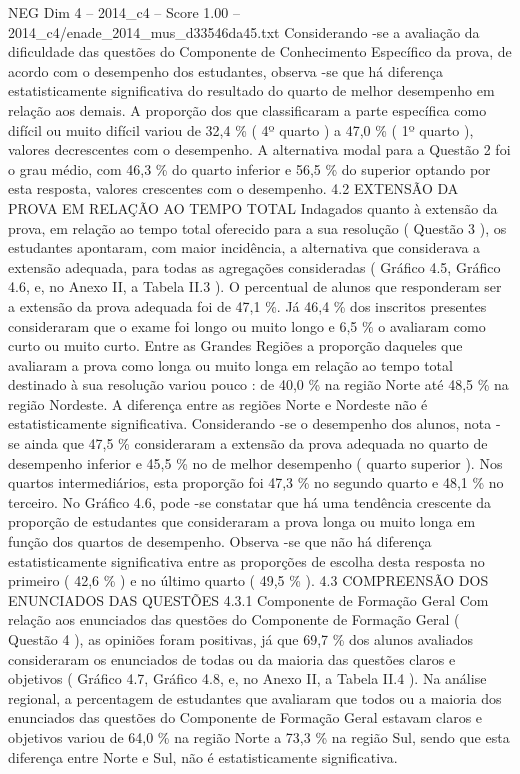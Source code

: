 \begin{textsample}{NEG Dim 4 – 2014\_c4 – Score 1.00 – 2014\_c4/enade\_2014\_mus\_d33546da45.txt}
Considerando -se a avaliação da dificuldade das questões do Componente de Conhecimento Específico da prova, de acordo com o desempenho dos estudantes, observa -se que há diferença estatisticamente significativa do resultado do quarto de melhor desempenho em relação aos demais.
A proporção dos que classificaram a parte específica como difícil ou muito difícil variou de 32,4 \% ( 4º quarto ) a 47,0 \% ( 1º quarto ), valores decrescentes com o desempenho.
A alternativa modal para a Questão 2 foi o grau médio, com 46,3 \% do quarto inferior e 56,5 \% do superior optando por esta resposta, valores crescentes com o desempenho. 4.2 EXTENSÃO DA PROVA EM RELAÇÃO AO TEMPO TOTAL Indagados quanto à extensão da prova, em relação ao tempo total oferecido para a sua resolução ( Questão 3 ), os estudantes apontaram, com maior incidência, a alternativa que considerava a extensão adequada, para todas as agregações consideradas ( Gráfico 4.5, Gráfico 4.6, e, no Anexo II, a Tabela II.3 ).
O percentual de alunos que responderam ser a extensão da prova adequada foi de 47,1 \%.
Já 46,4 \% dos inscritos presentes consideraram que o exame foi longo ou muito longo e 6,5 \% o avaliaram como curto ou muito curto.
Entre as Grandes Regiões a proporção daqueles que avaliaram a prova como longa ou muito longa em relação ao tempo total destinado à sua resolução variou pouco : de 40,0 \% na região Norte até 48,5 \% na região Nordeste.
A diferença entre as regiões Norte e Nordeste não é estatisticamente significativa.
Considerando -se o desempenho dos alunos, nota -se ainda que 47,5 \% consideraram a extensão da prova adequada no quarto de desempenho inferior e 45,5 \% no de melhor desempenho ( quarto superior ).
Nos quartos intermediários, esta proporção foi 47,3 \% no segundo quarto e 48,1 \% no terceiro.
No Gráfico 4.6, pode -se constatar que há uma tendência crescente da proporção de estudantes que consideraram a prova longa ou muito longa em função dos quartos de desempenho.
Observa -se que não há diferença estatisticamente significativa entre as proporções de escolha desta resposta no primeiro ( 42,6 \% ) e no último quarto ( 49,5 \% ). 4.3 COMPREENSÃO DOS ENUNCIADOS DAS QUESTÕES 4.3.1 Componente de Formação Geral Com relação aos enunciados das questões do Componente de Formação Geral ( Questão 4 ), as opiniões foram positivas, já que 69,7 \% dos alunos avaliados consideraram os enunciados de todas ou da maioria das questões claros e objetivos ( Gráfico 4.7, Gráfico 4.8, e, no Anexo II, a Tabela II.4 ).
Na análise regional, a percentagem de estudantes que avaliaram que todos ou a maioria dos enunciados das questões do Componente de Formação Geral estavam claros e objetivos variou de 64,0 \% na região Norte a 73,3 \% na região Sul, sendo que esta diferença entre Norte e Sul, não é estatisticamente significativa.

\end{textsample}
